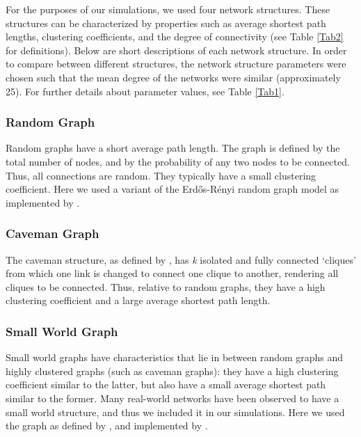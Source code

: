 For the purposes of our simulations, we used four network structures. These structures can be characterized by properties such as average shortest path lengths, clustering coefficients, and the degree of connectivity (see Table \ref{Tab2} for definitions). Below are short descriptions of each network structure. In order to compare between different structures, the network structure parameters were chosen such that the mean degree of the networks were similar (approximately 25). For further details about parameter values, see Table \ref{Tab1}.



\subsubsection{Random Graph}
\label{4.2}

Random graphs have a short average path length. The graph is defined by the total number of nodes, and by the probability of any two nodes to be connected. Thus, all connections are random. They typically have a small clustering coefficient. Here we used a variant of the Erd\H{o}s-R\'enyi random graph model \citep*{ER1960} as implemented by \citet*{BS2011}.

\subsubsection{Caveman Graph}
\label{4.3}

The caveman structure, as defined by \citet*{W2003}, has \emph{k} isolated and fully connected `cliques' from which one link is changed to connect one clique to another, rendering all cliques to be connected. Thus, relative to random graphs, they have a high clustering coefficient and a large average shortest path length.

\subsubsection{Small World Graph}
\label{4.4}

Small world graphs have characteristics that lie in between random graphs and highly clustered graphs (such as caveman graphs): they have a high clustering coefficient similar to the latter, but also have a small average shortest path similar to the former. Many real-world networks have been observed to have a small world structure, and thus we included it in our simulations. Here we used the graph as defined by \citet*{WS1998}, and implemented by \citet*{BS2011}.

